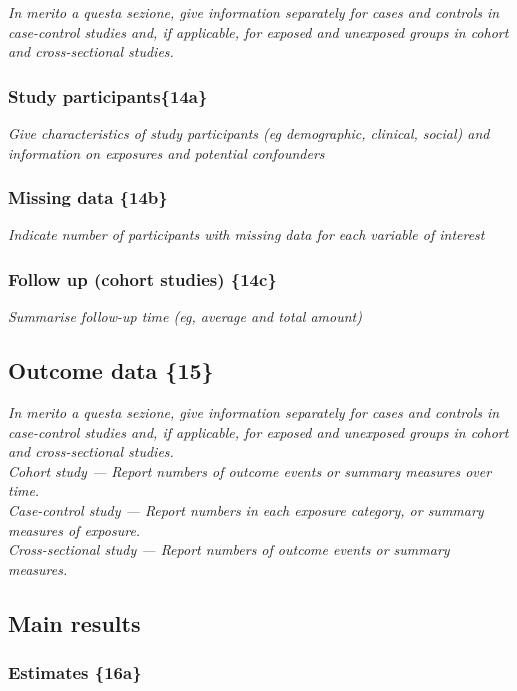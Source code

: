 {\em In merito a questa sezione, give information separately for cases and
controls in case-control studies and, if applicable, for exposed and
unexposed groups in cohort and cross-sectional studies.}

\subsubsection{Study participants\{14a\}}

{\em Give characteristics of study participants (eg demographic, clinical,
social) and information on exposures and potential confounders}

\subsubsection{Missing data \{14b\}}

{\em Indicate number of participants with missing data for each variable of
interest}

\subsubsection{Follow up (cohort studies) \{14c\}}

{\em Summarise follow-up time (eg, average and total amount)}

\subsection{Outcome data \{15\}}

{\em In merito a questa sezione, give information separately for cases and
controls in case-control studies and, if applicable, for exposed and
unexposed groups in cohort and cross-sectional studies.\\
Cohort study — Report numbers of outcome events or summary measures
over time.\\
Case-control study — Report numbers in each exposure category, or
summary measures of exposure.\\
Cross-sectional study — Report numbers of outcome events or summary
measures.
}

\subsection{Main results}

\subsubsection{Estimates \{16a\}}

